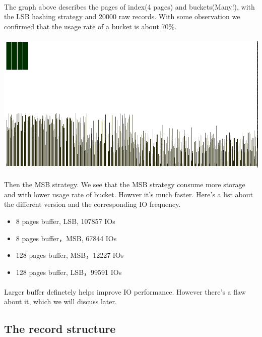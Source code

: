 \documentclass{article}
\begin{document}
        \paragraph{}
            The graph above describes the pages of index(4 pages) and buckets(Many!), with the LSB hashing strategy and 20000 raw records. With some observation we confirmed that the usage rate of a bucket is about 70\%. 
        \paragraph{} \includegraphics[scale=0.4]{img/pic20000_h.png}
        \paragraph{}
            Then the MSB strategy. We see that the MSB strategy consume more storage and with lower usage rate of bucket. Howver it's much faster. Here's a list about the different version and the corresponding IO frequency.
        \begin{itemize}
            \item 8 pages buffer, LSB, 107857 IOs
            \item 8 pages buffer，MSB, 67844 IOs
            \item 128 pages buffer, MSB，12227 IOs
            \item 128 pages buffer, LSB，99591 IOs
        \end{itemize}
        \paragraph{}
            Larger buffer definetely helps improve IO performance. However there's a flaw about it, which we will discuss later.
    \subsection{The record structure}
\end{document}
